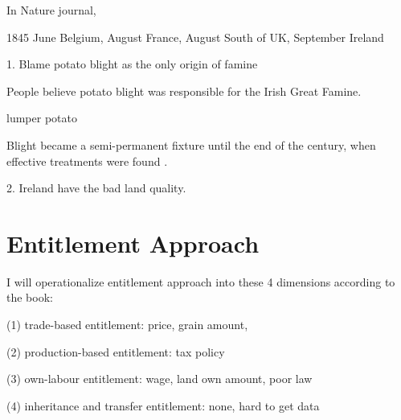 In Nature journal,

1845 June Belgium, August France, August South of UK, September Ireland





1. Blame potato blight as the only origin of famine

People believe potato blight was responsible for the Irish Great Famine. 

lumper potato

Blight became a semi-permanent fixture until the end of the century, when effective treatments were found \citep{o1994economic}.

2. Ireland have the bad land quality.

\section{Entitlement Approach}

I will operationalize entitlement approach into these 4 dimensions according to the book:

(1) trade-based entitlement: price, grain amount, 

(2) production-based entitlement: tax policy

(3) own-labour entitlement: wage, land own amount, poor law

(4) inheritance and transfer entitlement: none, hard to get data



